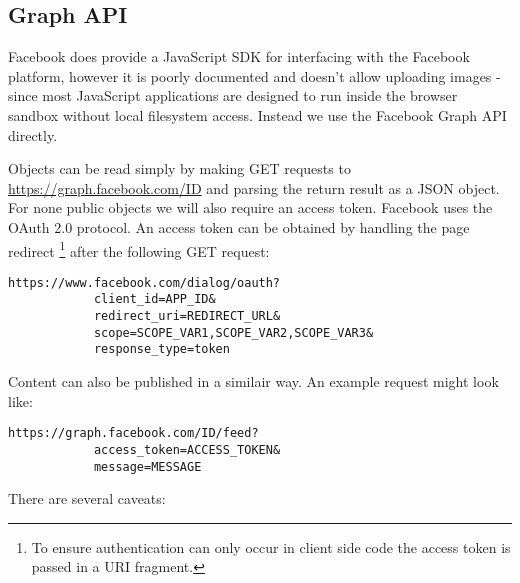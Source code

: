 \FloatBarrier
\subsection{Graph API}

Facebook does provide a JavaScript SDK for interfacing with the Facebook platform, however it is poorly documented and doesn't allow uploading images - since most JavaScript applications are designed to run inside the browser sandbox without local filesystem access. Instead we use the Facebook Graph API directly.

Objects can be read simply by making GET requests to \url{https://graph.facebook.com/ID} and parsing the return result as a JSON object. For none public objects we will also require an access token. Facebook uses the OAuth 2.0 protocol. An access token can be obtained by handling the page redirect \footnote{To ensure authentication can only occur in client side code the access token is passed in a URI fragment.} after the following GET request:

\FloatBarrier
    \begin{lstlisting}[label=code:auth,caption=Authentication GET request,float=h]
        https://www.facebook.com/dialog/oauth?
            client_id=APP_ID&
            redirect_uri=REDIRECT_URL&
            scope=SCOPE_VAR1,SCOPE_VAR2,SCOPE_VAR3&
            response_type=token
    \end{lstlisting}
\FloatBarrier

    
Content can also be published in a similair way. An example request might look like:

\FloatBarrier
    \begin{lstlisting}[label=code:pub,caption=Publishing POST request,float=h]
        https://graph.facebook.com/ID/feed?
            access_token=ACCESS_TOKEN&
            message=MESSAGE
    \end{lstlisting}
\FloatBarrier    
    

There are several caveats:

